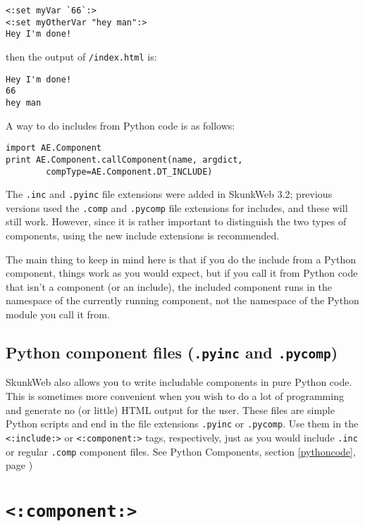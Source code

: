 \documentclass{manual}
\begin{document}
\begin{verbatim}<:set myVar `66`:>
<:set myOtherVar "hey man":>
Hey I'm done!
\end{verbatim}

then the output of \texttt{/index.html} is:

\begin{verbatim}Hey I'm done!
66
hey man
\end{verbatim}

A way to do includes from Python code is as follows:
\begin{verbatim}
import AE.Component
print AE.Component.callComponent(name, argdict, 
        compType=AE.Component.DT_INCLUDE)
\end{verbatim}

 The \texttt{.inc} and \texttt{.pyinc} file
extensions were added in SkunkWeb 3.2; previous versions used the
\texttt{.comp} and \texttt{.pycomp} file extensions for includes, and
these will still work.  However, since it is rather important to
distinguish the two types of components, using the new include
extensions is recommended.


 The main thing to keep in mind here is that if you do
the include from a Python component, things work as you would expect,
but if you call it from Python code that isn't a component (or an
include), the included component runs in the namespace of the
currently running component, not the namespace of the Python module
you call it from.


\subsection{Python component files (\texttt{.pyinc} and \texttt{.pycomp})}

SkunkWeb also allows you to write includable components in pure Python
code. This is sometimes more convenient when you wish to do a lot of
programming and generate no (or little) HTML output for the
user. These files are simple Python scripts and end in the file
extensions \texttt{.pyinc}  or  \texttt{.pycomp}.  Use them in the 
\texttt{<:include:>} or \texttt{<:component:>} 
tags, respectively,  just as you would include \texttt{.inc} or regular
\texttt{.comp} component files.  See Python Components,
section \ref{pythoncode}, page \pageref{pythoncode})




\section{\texttt{<:component:>}}
\label{tagcomponent}
\end{document}
